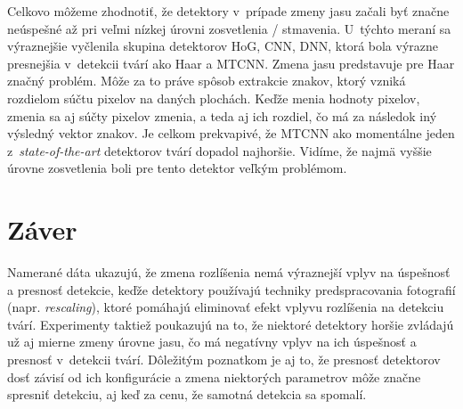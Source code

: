 \documentclass[]{article}
\begin{document}
	Celkovo môžeme zhodnotiť, že detektory v~prípade zmeny jasu začali byť značne neúspešné až pri veľmi nízkej úrovni zosvetlenia / stmavenia. U~týchto meraní sa výraznejšie vyčlenila skupina detektorov HoG, CNN, DNN, ktorá bola výrazne presnejšia v~detekcii tvárí ako Haar a MTCNN. Zmena jasu predstavuje pre Haar značný problém. Môže za to práve spôsob extrakcie znakov, ktorý vzniká rozdielom súčtu pixelov na daných plochách. Keďže menia hodnoty pixelov, zmenia sa aj súčty pixelov zmenia, a teda aj ich rozdiel, čo má za následok iný výsledný vektor znakov. Je celkom prekvapivé, že MTCNN ako momentálne jeden z~\textit{state-of-the-art} detektorov tvárí dopadol najhoršie. Vidíme, že najmä vyššie úrovne zosvetlenia boli pre tento detektor veľkým problémom.
	
	\section{Záver}
	
	Namerané dáta ukazujú, že zmena rozlíšenia nemá výraznejší vplyv na úspešnosť a presnosť detekcie, keďže detektory používajú techniky predspracovania fotografií (napr. \textit{rescaling}), ktoré pomáhajú eliminovať efekt vplyvu rozlíšenia na detekciu tvárí. Experimenty taktiež poukazujú na to, že niektoré detektory horšie zvládajú už aj mierne zmeny úrovne jasu, čo má negatívny vplyv na ich úspešnosť a presnosť v~detekcii tvárí. Dôležitým poznatkom je aj to, že presnosť detektorov dosť závisí od ich konfigurácie a zmena niektorých parametrov môže značne spresniť detekciu, aj keď za cenu, že samotná detekcia sa spomalí.
	
	
\end{document}
